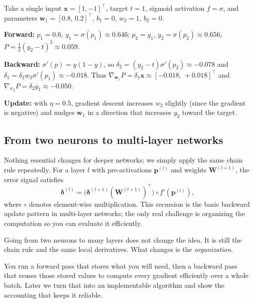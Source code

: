 \begin{tcolorbox}[summarybox, title={Worked example: one numerical gradient step (sanity check)}]
Take a single input $\mathbf{x} = [1,-1]^\top$, target $t=1$, sigmoid activation $f=\sigma$, and parameters
$\mathbf{w}_1=[0.8,\,0.2]^\top$, $b_1=0$, $w_2=1$, $b_2=0$.
\medskip

\noindent\textbf{Forward:} $p_1=0.6$, $y_1=\sigma(p_1)\approx 0.646$; $p_2=y_1$, $y_2=\sigma(p_2)\approx 0.656$; $P=\tfrac12(y_2-t)^2\approx 0.059$.
\medskip

\noindent\textbf{Backward:} $\sigma'(p)=y(1-y)$, so $\delta_2=(y_2-t)\sigma'(p_2)\approx -0.078$ and $\delta_1=\delta_2 w_2 \sigma'(p_1)\approx -0.018$.
Thus $\nabla_{\mathbf{w}_1}P=\delta_1 \mathbf{x} \approx [-0.018,\,+0.018]^\top$ and $\nabla_{w_2}P=\delta_2 y_1\approx -0.050$.
\medskip

\noindent\textbf{Update:} with $\eta=0.5$, gradient descent increases $w_2$ slightly (since the gradient is negative) and nudges $\mathbf{w}_1$ in a direction that increases $y_2$ toward the target.
\end{tcolorbox}

\subsection{From two neurons to multi-layer networks}
\label{sec:mlp_from_two_neurons_to_multi_layer_networks}

Nothing essential changes for deeper networks; we simply apply the same chain rule repeatedly. For a layer $l$ with pre\hyp{}activations $\mathbf{p}^{(l)}$ and weights $\mathbf{W}^{(l+1)}$, the error signal satisfies
\begin{equation}
\boldsymbol{\delta}^{(l)} = \bigl(\boldsymbol{\delta}^{(l+1)} (\mathbf{W}^{(l+1)})^\top\bigr) \circ f'(\mathbf{p}^{(l)}),
\label{eq:delta_recursion}
\end{equation}
where $\circ$ denotes element\hyp{}wise multiplication. This recursion is the basic backward update pattern in multi-layer networks; the only real challenge is organizing the computation so you can evaluate it efficiently.

\begin{tcolorbox}[summarybox, title={Author's note: what changes when you scale up}]
Going from two neurons to many layers does not change the idea. It is still the chain rule and the same local derivatives. What changes is the \emph{organization}.

You run a forward pass that stores what you will need, then a backward pass that reuses those stored values to compute every gradient efficiently over a whole batch. Later we turn that into an implementable algorithm and show the accounting that keeps it reliable.
\end{tcolorbox}

